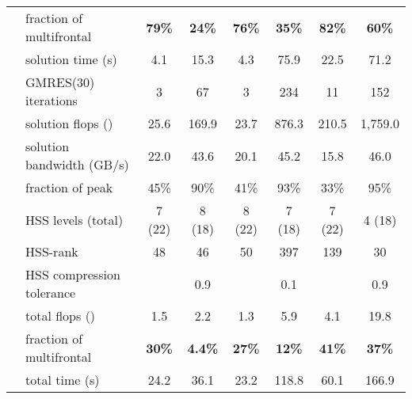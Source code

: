 \documentclass{article}
\begin{document}
\begin{table}[htp!]
\begin{center}
\begin{tabular}{|c|l||c|c|c|c|c|c|}
      &      \qquad fraction of multifrontal      &  \textbf{79\%}   & \textbf{24\%}    & \textbf{76\%}   & \textbf{35\%}   & \textbf{82\%}  & \textbf{60\%} \\
      \hhline{|~-||-|-|-|-|-|-|}                                                               
      &                       solution time (s) &   4.1   & 15.3    &  4.3   &  75.9  & 22.5  &  71.2 \\ 
      \hhline{|~-||-|-|-|-|-|-|}                                                               
      &                      GMRES(30) iterations  &   3     &   67    &  3     &  234  &  11   &  152 \\ 
      \hhline{|~-||-|-|-|-|-|-|}                                                               
      &          solution flops () &  25.6   &  169.9   &  23.7 &  876.3 &  210.5 & 1,759.0 \\ 
      \hhline{|~-||-|-|-|-|-|-|}                                                         
      &                solution bandwidth (GB/s) & 22.0  & 43.6  & 20.1  & 45.2  & 15.8 & 46.0  \\
      &   \qquad fraction of peak                &  45\% & 90\%  &  41\%  & 93\%  & 33\% & 95\% \\
      \hhline{|~-||-|-|-|-|-|-|}                                                               
      &             HSS levels  (total) &  7 (22)  &  8 (18) &  8 (22) & 7 (18) & 7 (22) &  4 (18) \\ 
      \hhline{|~-||-|-|-|-|-|-|}                                                               
      &                                HSS-rank &  48      &   46    &  50    &  397   &  139  & 30 \\ 
      \hhline{|~-||-|-|-|-|-|-|}                                                               
      & HSS compression tolerance  &  & 0.9 &   &  0.1  &  & 0.9 \\ 
      \hhline{|~-||-|-|-|-|-|-|}                                                               
      &          total flops () &  1.5    &  2.2 & 1.3 & 5.9 & 4.1 & 19.8    \\ 
      &    \qquad fraction of multifrontal     &  \textbf{30\%} & \textbf{4.4\%} & \textbf{27\%} & \textbf{12\%} & \textbf{41\%} & \textbf{37\%}  \\
      \hhline{|~-||-|-|-|-|-|-|}                                                               
      &                         total time (s) &  24.2   &  36.1  &  23.2  &  118.8  & 60.1 & 166.9 \\ 

\end{tabular}
\end{center}
\end{table}
\end{document}
